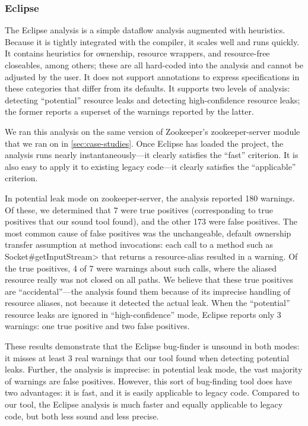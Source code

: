 \subsubsection{Eclipse}
\label{sec:eclipse}

The Eclipse analysis is a simple dataflow analysis
augmented with heuristics. Because it is tightly integrated with
the compiler, it scales well and runs quickly. It contains
heuristics for ownership, resource wrappers, and resource-free
closeables, among others; these are all hard-coded into the analysis and cannot
be adjusted by the user. It does not support annotations to express
specifications in these categories that differ from its defaults.
It supports two levels of analysis: detecting ``potential'' resource
leaks and detecting high-confidence resource leaks; the former reports a superset
of the warnings reported by the latter.

We ran this analysis on the same version of Zookeeper's zookeeper-server
module that we ran \Tool on in \cref{sec:case-studies}. Once Eclipse
has loaded the project, the analysis runs nearly instantaneously---it
clearly satisfies the ``fast'' criterion. It is also easy to apply it to
existing legacy code---it clearly satisfies the ``applicable'' criterion.

In potential leak mode on zookeeper-server, the analysis reported 180
warnings.  Of these, we determined that 7 were true positives
(corresponding to true positives that our sound tool found), and the
other 173 were false positives.  The most common cause of false
positives was the unchangeable, default ownership transfer assumption
at method invocations: each call to a method such as
\<Socket\#getInputStream> that returns a resource-alias resulted in a
warning.  Of the true positives, 4 of 7 were warnings about such
calls, where the aliased resource really was not closed on all
paths. We believe that these true positives are ``accidental''---the
analysis found them because of its imprecise handling of resource
aliases, not because it detected the actual leak. When the
``potential'' resource leaks are ignored in ``high-confidence'' mode,
Eclipse reports only 3 warnings: one true positive and two false
positives.

These results demonstrate that the Eclipse bug-finder is unsound in both
modes: it misses at least 3 real warnings that our tool found when detecting
potential leaks. Further, the analysis is imprecise: in potential leak mode,
the vast majority of warnings are false positives. However, this sort
of bug-finding tool does have two advantages: it is fast, and it is easily
applicable to legacy code. Compared to our tool, the Eclipse analysis
is much faster and equally applicable to legacy code, but both less sound
and less precise.

